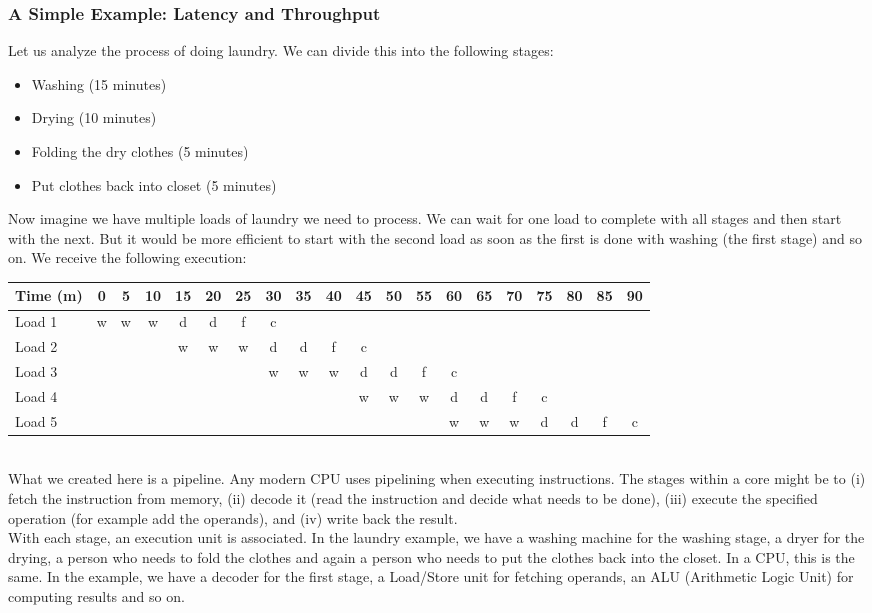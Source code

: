 \documentclass[main.tex]{subfiles}
\begin{document}
\subsubsection{A Simple Example: Latency and Throughput}
Let us analyze the process of doing laundry. We can divide this into the following stages:
\begin{itemize}
  \item Washing (15 minutes)
  \item Drying (10 minutes)
  \item Folding the dry clothes (5 minutes)
  \item Put clothes back into closet (5 minutes)
\end{itemize}
Now imagine we have multiple loads of laundry we need to process. We can wait for one load to complete with all stages and then start with the next. But it would be more efficient to start with the second load as soon as the first is done with washing (the first stage) and so on. We receive the following execution:\\[3mm]
\begin{tabular}{l | *{19}{c}}
    Time (m) & 0 & 5 & 10 & 15 & 20 & 25 & 30 & 35 & 40 & 45 & 50 & 55 & 60 & 65 & 70 & 75 & 80 & 85 & 90 \\
    \hline
    Load 1 & w & w & w & d & d & f & c\\
    Load 2 &   &   &   & w & w & w & d & d & f & c\\
    Load 3 &   &   &   &   &   &   & w & w & w & d & d & f & c \\
    Load 4 &   &   &   &   &   &   &   &   &   & w & w & w & d & d & f & c \\
    Load 5 &   &   &   &   &   &   &   &   &   &   &   &   & w & w & w & d & d & f & c
\end{tabular} \\[3mm]
What we created here is a pipeline. Any modern CPU uses pipelining when executing instructions. The stages within a core might be to (i) fetch the instruction from memory, (ii) decode it (read the instruction and decide what needs to be done), (iii) execute the specified operation (for example add the operands), and (iv) write back the result.\\
With each stage, an execution unit is associated. In the laundry example, we have a washing machine for the washing stage, a dryer for the drying, a person who needs to fold the clothes and again a person who needs to put the clothes back into the closet. In a CPU, this is the same. In the example, we have a decoder for the first stage, a Load/Store unit for fetching operands, an ALU (Arithmetic Logic Unit) for computing results and so on.\\
\end{document}
